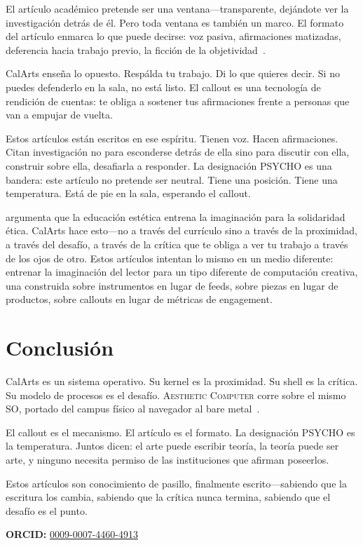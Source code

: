 \documentclass[10pt,letterpaper,twocolumn]{article}
\newcommand{\ac}{\textsc{Aesthetic Computer}}
\begin{document}
El artículo académico pretende ser una ventana---transparente, dejándote ver la investigación detrás de él. Pero toda ventana es también un marco. El formato del artículo enmarca lo que puede decirse: voz pasiva, afirmaciones matizadas, deferencia hacia trabajo previo, la ficción de la objetividad~\citep{freire1970pedagogy}.

CalArts enseña lo opuesto. Respálda tu trabajo. Di lo que quieres decir. Si no puedes defenderlo en la sala, no está listo. El callout es una tecnología de rendición de cuentas: te obliga a sostener tus afirmaciones frente a personas que van a empujar de vuelta.

Estos artículos están escritos en ese espíritu. Tienen voz. Hacen afirmaciones. Citan investigación no para esconderse detrás de ella sino para discutir con ella, construir sobre ella, desafiarla a responder. La designación PSYCHO es una bandera: este artículo no pretende ser neutral. Tiene una posición. Tiene una temperatura. Está de pie en la sala, esperando el callout.

\citet{spivak2012aesthetic} argumenta que la educación estética entrena la imaginación para la solidaridad ética. CalArts hace esto---no a través del currículo sino a través de la proximidad, a través del desafío, a través de la crítica que te obliga a ver tu trabajo a través de los ojos de otro. Estos artículos intentan lo mismo en un medio diferente: entrenar la imaginación del lector para un tipo diferente de computación creativa, una construida sobre instrumentos en lugar de feeds, sobre piezas en lugar de productos, sobre callouts en lugar de métricas de engagement.

\section{Conclusión}

CalArts es un sistema operativo. Su kernel es la proximidad. Su shell es la crítica. Su modelo de procesos es el desafío. \ac{} corre sobre el mismo SO, portado del campus físico al navegador al bare metal~\citep{scudder2026ac, scudder2026os}.

El callout es el mecanismo. El artículo es el formato. La designación PSYCHO es la temperatura. Juntos dicen: el arte puede escribir teoría, la teoría puede ser arte, y ninguno necesita permiso de las instituciones que afirman poseerlos.

Estos artículos son conocimiento de pasillo, finalmente escrito---sabiendo que la escritura los cambia, sabiendo que la crítica nunca termina, sabiendo que el desafío es el punto.

\vspace{0.5em}
\noindent\textbf{ORCID:} \href{https://orcid.org/0009-0007-4460-4913}{0009-0007-4460-4913}



\end{document}
